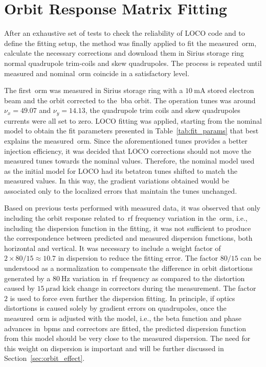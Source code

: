 \section{Orbit Response Matrix Fitting}\label{sec:orm_fit}
After an exhaustive set of tests to check the reliability of LOCO code and to define the fitting setup, the method was finally applied to fit the measured~\gls{orm}, calculate the necessary corrections and download them in Sirius storage ring normal quadrupole trim-coils and skew quadrupoles. The process is repeated until measured and nominal~\gls{orm} coincide in a satisfactory level.

The first~\gls{orm} was measured in Sirius storage ring with a $\SI{10}{\milli\ampere}$ stored electron beam and the orbit corrected to the~\gls{bba} orbit. The operation tunes was around $\nu_x = 49.07$ and $\nu_y = 14.13$, the quadrupole trim coils and skew quadrupoles currents were all set to zero. LOCO fitting was applied, starting from the nominal model to obtain the fit parameters presented in Table~\ref{tab:fit_params} that best explains the measured~\gls{orm}. Since the aforementioned tunes provides a better injection efficiency, it was decided that LOCO corrections should not move the measured tunes towards the nominal values. Therefore, the nominal model used as the initial model for LOCO had its betatron tunes shifted to match the measured values. In this way, the gradient variations obtained would be associated only to the localized errors that maintain the tunes unchanged.

Based on previous tests performed with measured data, it was observed that only including the orbit response related to~\gls{rf} frequency variation in the~\gls{orm}, i.e., including the dispersion function in the fitting, it was not sufficient to produce the correspondence between predicted and measured dispersion functions, both horizontal and vertical. It was necessary to include a weight factor of $2 \times 80/15 \approx 10.7$ in dispersion to reduce the fitting error. The factor $80/15$ can be understood as a normalization to compensate the difference in orbit distortions generated by a $\SI{80}{\hertz}$ variation in~\gls{rf} frequency as compared to the distortion caused by $\SI{15}{\micro\radian}$ kick change in correctors during the measurement. The factor $2$ is used to force even further the dispersion fitting. In principle, if optics distortions is caused solely by gradient errors on quadrupoles, once the measured~\gls{orm} is adjusted with the model, i.e., the beta function and phase advances in~\glspl{bpm} and correctors are fitted, the predicted dispersion function from this model should be very close to the measured dispersion. The need for this weight on dispersion is important and will be further discussed in Section~\ref{sec:orbit_effect}.

